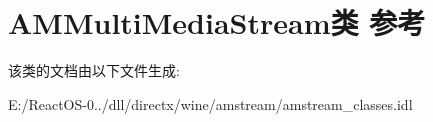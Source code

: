 \hypertarget{class_a_m_multi_media_stream}{}\section{A\+M\+Multi\+Media\+Stream类 参考}
\label{class_a_m_multi_media_stream}


该类的文档由以下文件生成\+:\begin{DoxyCompactItemize}
\item 
E\+:/\+React\+O\+S-\/0../dll/directx/wine/amstream/amstream\+\_\+classes.\+idl\end{DoxyCompactItemize}
